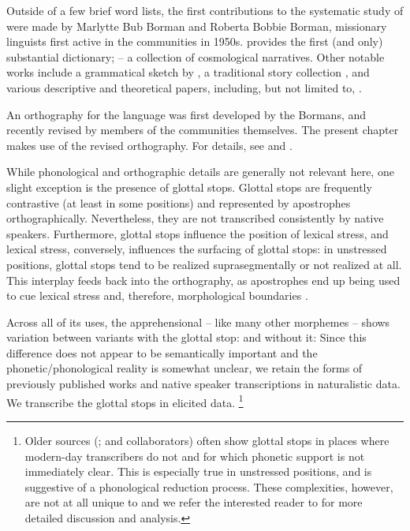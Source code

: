 \documentclass[output=paper,colorlinks,citecolor=brown]{langscibook}
\begin{document}
Outside of a few brief word lists, the first contributions to the systematic study of  were made by Marlytte Bub Borman and Roberta Bobbie Borman, missionary linguists first active in the  communities in 1950s. \citet{dictionary} provides the first (and only) substantial dictionary; \citet{borman1990cosmologia} -- a collection of cosmological narratives. Other notable works include a grammatical sketch by \citet{fischerhengeveld}, a traditional story collection \citep{Mitos}, and
various descriptive and theoretical papers, including, but not limited to, \citet{anderboissilva2018collection, repetti-ludlow2019aingae, pridetomlinlingview, dabkowski2019morphophonology, dabkowski2021ldd, dabkowski2021phonology, dabkowski2023nllt, dabkowski2024llc, sanker-reconstruction,  anderbois2023forms, dabkowski2024jos, anderbois2020salt, anderbois-llc, zheng2023definiteness, morvillo2021inner}.

An orthography for the language was first developed by the Bormans, and recently revised by members of the  communities themselves. The present chapter makes use of the revised orthography. For details, see \citet{fischerhengeveld} and \citet{repetti-ludlow2019aingae}.

While phonological and orthographic details are generally not relevant here, one slight exception is the presence of glottal stops. Glottal stops are frequently contrastive (at least in some positions) and represented by apostrophes orthographically. Nevertheless, they are not transcribed consistently by native speakers. Furthermore, glottal stops influence the position of lexical stress, and lexical stress, conversely, influences the surfacing of glottal stops: in unstressed positions, glottal stops tend to be realized suprasegmentally or not realized at all. This interplay feeds back into the orthography, as apostrophes end up being used to cue lexical stress and, therefore, morphological boundaries \citep{dabkowski2023nllt}. 

Across all of its uses, the apprehensional  -- like many other mor\-phemes -- shows variation between variants with the glottal stop:  and without it:  Since this difference does not appear to be semantically important and the phonetic/phonological reality is somewhat unclear, we retain the forms of previously published works and native speaker transcriptions in naturalistic data. {We transcribe the glottal stops in elicited data.}%
\footnote{{Older sources (\citealt{borman1990cosmologia, borman1990lessons, dictionary}; and collaborators) often show glottal stops in places where modern-day transcribers do not and for which phonetic support is not immediately clear. This is especially true in unstressed positions, and is suggestive of a phonological reduction process. These complexities, however, are not at all unique to  and we refer the interested reader to \citet{dabkowski2023nllt} for more detailed discussion and analysis.}}
\end{document}
